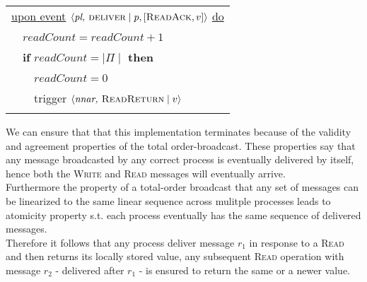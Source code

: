 \documentclass{article}
\begin{document}
\begin{center}
\begin{tabular}{l}
			\\
			\underline{upon event} $\langle \textit{pl, } \textsc{deliver} \mid p, [\textsc{ReadAck},v] \rangle$ \underline{do} \\
			\ \ $\textit{readCount} = \textit{readCount} + 1$ \\
			\ \ \textbf{if} $\textit{readCount} = \mid \Pi \mid$ \textbf{then} \\
			\ \ \ \ $\textit{readCount} = 0$ \\
			\ \ \ \ trigger $\langle \textit{nnar, } \textsc{ReadReturn} \mid v \rangle$ \\
			\\
		\end{tabular}
	\end{center}
	\begin{adjustwidth}{2em}{2em}
		We can ensure that that this implementation terminates because of the validity and agreement properties of the total order-broadcast. These properties say that any message broadcasted by any correct process is eventually delivered by itself, hence both the \textsc{Write} and \textsc{Read} messages will eventually arrive. \\
		Furthermore the property of a total-order broadcast that any set of messages can be  linearized to the same linear sequence across mulitple processes leads to atomicity property s.t. each process eventually has the same sequence of delivered messages. \\
		Therefore it follows that any process deliver message $r_1$ in response to a \textsc{Read} and then returns its locally stored value, any subsequent \textsc{Read} operation with message $r_2$ - delivered after $r_1$ - is ensured to return the same or a newer value.
	\end{adjustwidth}
	
\end{document}
